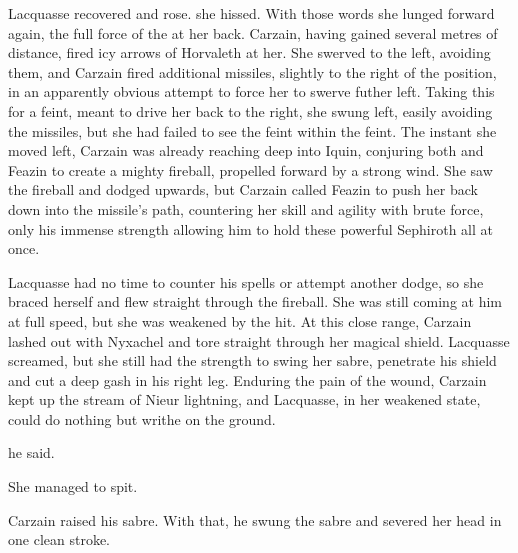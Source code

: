 \documentclass[a4paper,10pt,openany,oneside]{article}
\begin{document}
Lacquasse recovered and rose.  she hissed.  With those words she lunged forward again, the full force of the \Sephirah{} at her back. Carzain, having gained several metres of distance, fired icy arrows of Horvaleth at her. She swerved to the left, avoiding them, and Carzain fired additional missiles, slightly to the right of the position, in an apparently obvious attempt to force her to swerve futher left. Taking this for a feint, meant to drive her back to the right, she swung left, easily avoiding the missiles, but she had failed to see the feint within the feint. The instant she moved left, Carzain was already reaching deep into Iquin, conjuring both \Izion and Feazin to create a mighty fireball, propelled forward by a strong wind. She saw the fireball and dodged upwards, but Carzain called Feazin to push her back down into the missile's path, countering her skill and agility with brute force, only his immense strength allowing him to hold these powerful Sephiroth all at once. 

Lacquasse had no time to counter his spells or attempt another dodge, so she braced herself and flew straight through the fireball. She was still coming at him at full speed, but she was weakened by the hit. At this close range, Carzain lashed out with Nyxachel and tore straight through her magical shield. Lacquasse screamed, but she still had the strength to swing her sabre, penetrate his shield and cut a deep gash in his right leg. Enduring the pain of the wound, Carzain kept up the stream of Nieur lightning, and Lacquasse, in her weakened state, could do nothing but writhe on the ground. 

 he said.  

She managed to spit.  

 Carzain raised his sabre.  With that, he swung the sabre and severed her head in one clean stroke. 
\end{document}
